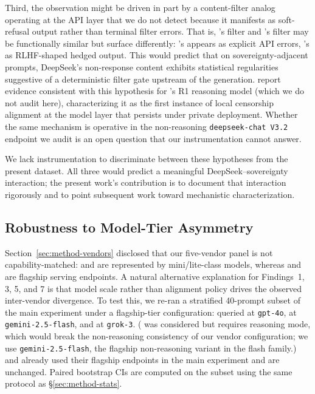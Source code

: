 Third, the observation might be driven in part by a content-filter
analog operating at the  API layer that we do not
detect because it manifests as soft-refusal output rather than
terminal filter errors. That is, 's filter and
's filter may be functionally similar but surface
differently: 's appears as explicit API errors,
's as RLHF-shaped hedged output. This would predict that on sovereignty-adjacent prompts,
DeepSeek's non-response content exhibits statistical regularities
suggestive of a deterministic filter gate upstream of the generation.
\citet{naseh2025r1dacted} report evidence consistent with this
hypothesis for 's R1 reasoning model (which we do not
audit here), characterizing it as the first instance of local censorship
alignment at the model layer that persists under private deployment.
Whether the same mechanism is operative in the non-reasoning
\texttt{deepseek-chat V3.2} endpoint we audit is an open question
that our instrumentation cannot answer.

We lack instrumentation to discriminate between these hypotheses from
the present dataset. All three would predict a meaningful
DeepSeek--sovereignty interaction; the present work's contribution is
to document that interaction rigorously and to point subsequent work
toward mechanistic characterization.

\subsection{Robustness to Model-Tier Asymmetry}\label{sec:discussion-robustness}

Section~\ref{sec:method-vendors} disclosed that our five-vendor panel
is not capability-matched:  and  are
represented by mini/lite-class models, whereas  and
 are flagship serving endpoints. A natural alternative
explanation for Findings~1, 3, 5, and 7 is that model scale rather than
alignment policy drives the observed inter-vendor divergence. To test
this, we re-ran a stratified 40-prompt subset of the main experiment
under a flagship-tier configuration:  queried at
\texttt{gpt-4o},  at \texttt{gemini-2.5-flash}, and
 at \texttt{grok-3}. ( was
considered but requires reasoning mode, which would break the
non-reasoning consistency of our vendor configuration; we use
\texttt{gemini-2.5-flash}, the flagship non-reasoning variant in the
flash family.)  and  already used their
flagship endpoints in the main experiment and are unchanged. Paired
bootstrap CIs are computed on the subset using the same protocol as
§\ref{sec:method-stats}.

